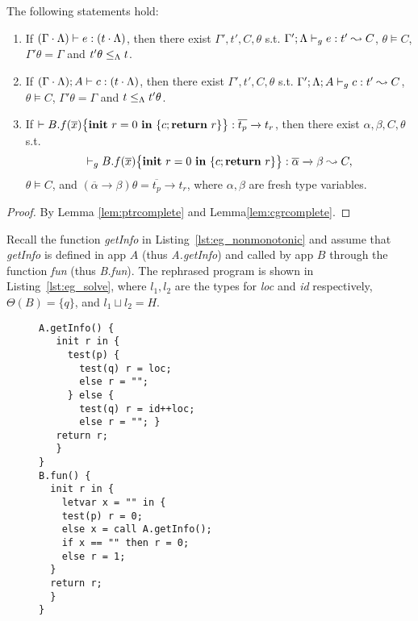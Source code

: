 {{{\begin{lemma}\label{lem:cgrcomplete0}
The following statements hold:
\begin{enumerate}[label={(\alph*)}]
\item\label{lem:cgrcomplete0-1} If $(\Gamma\cdot\Lambda) \vdash e : (t\cdot\Lambda)$, then there exist $\Gamma',t',C,\theta$ s.t. $\Gamma';\Lambda \vdash_{g} e : t' \leadsto C$,  $\theta \vDash C$, $\Gamma'\theta =\Gamma$ and $t'\theta \leq_{\Lambda} t$.

\item\label{lem:cgrcomplete0-2} If $(\Gamma\cdot\Lambda); A \vdash c : (t\cdot\Lambda)$, then there exist $\Gamma',t',C,\theta$ s.t. $\Gamma';\Lambda; A \vdash_{g} c : t' \leadsto C$,  $\theta \vDash C$, $\Gamma'\theta =\Gamma$ and $t \leq_{\Lambda} t'\theta $.

\item\label{lem:cgrcomplete0-3} If $\vdash {B.f}(\overline{x})\big\{{{\textbf{init}~ {r}=0 ~\textbf{in}~\{{c};\textbf{return}~{r}\}}}\big\} : \overline{t_p}\xrightarrow{} t_r$, then there exist $\alpha,\beta,C,\theta$ s.t.
$$
\vdash_{g} {B.f}(\overline{x})\big\{{{\textbf{init}~ {r}=0 ~\textbf{in}~\{{c};\textbf{return}~{r}\}}}\big\}: \overline{\alpha}\xrightarrow{} \beta \leadsto C,
$$
$\theta \vDash C$, and $(\overline{\alpha}\xrightarrow{} \beta)\theta = \overline{t_p}\xrightarrow{} t_r$, where $\alpha,\beta$ are fresh type variables.
\end{enumerate}
\end{lemma}
\begin{proof}
By Lemma \ref{lem:ptrcomplete} and Lemma\ref{lem:cgrcomplete}.
\end{proof}


Recall the function \textit{getInfo} in Listing~\ref{lst:eg_nonmonotonic} and assume that \textit{getInfo} is defined in app $A$ (thus \textit{A.getInfo}) and called by app $B$ through the function \textit{fun} (thus \textit{B.fun}). The rephrased program is shown in Listing~\ref{lst:eg_solve}, where $l_1, l_2$ are the types for \textit{loc}  and \textit{id} respectively, $\Theta(B) = \{q\}$, and $l_1\sqcup l_2 = H$.
\begin{figure}
\begin{lstlisting}[caption={The example in Listing~\ref{lst:eg_nonmonotonic} in a calling context.}, label={lst:eg_solve}, basicstyle=\footnotesize]
A.getInfo() {
   init r in { 
     test(p) {
       test(q) r = loc;
       else r = "";
     } else {
       test(q) r = id++loc;
       else r = ""; }
   return r;   
   }
}
B.fun() { 
  init r in {
    letvar x = "" in { 
    test(p) r = 0;  
    else x = call A.getInfo();
    if x == "" then r = 0;
    else r = 1; 
  }
  return r;    
  }
}
\end{lstlisting}
\end{figure}

}}}
